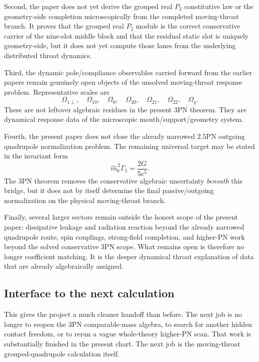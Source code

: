 \documentclass[11pt]{article}
\begin{document}
Second, the paper does not yet derive the grouped real $P_2$ constitutive law or
the geometry-side completion microscopically from the completed moving-throat
branch.  It proves that the grouped real $P_2$ module is the correct
conservative carrier of the nine-slot middle block and that the residual static
slot is uniquely geometry-side, but it does not yet compute those lanes from the
underlying distributed throat dynamics.

Third, the dynamic pole/compliance observables carried forward from the earlier
papers remain genuinely open objects of the unsolved moving-throat response
problem.  Representative scales are
\begin{equation}
\Omega_{1\perp},\quad
\Omega_{10},\quad
\Omega_0,\quad
\Omega_{20},\quad
\Omega_{21},\quad
\Omega_{22},\quad
\Omega_g.
\label{eq:conclusions-open-poles}
\end{equation}
These are not leftover algebraic residues in the present $3$PN theorem.  They
are dynamical response data of the microscopic mouth/support/geometry system.

Fourth, the present paper does not close the already narrowed $2.5$PN outgoing
quadrupole normalization problem.  The remaining universal target may be stated
in the invariant form
\begin{equation}
\boxed{\hat m_0^{\,2}\Gamma_5=\frac{2G}{5c^5}.}
\label{eq:conclusions-normalization-target}
\end{equation}
The $3$PN theorem removes the conservative algebraic uncertainty \emph{beneath}
this bridge, but it does not by itself determine the final passive/outgoing
normalization on the physical moving-throat branch.

Finally, several larger sectors remain outside the honest scope of the present
paper: dissipative leakage and radiation reaction beyond the already narrowed
quadrupole route, spin couplings, strong-field completion, and higher-PN work
beyond the solved conservative $3$PN scope.  What remains open is therefore no
longer coefficient matching.  It is the deeper dynamical throat explanation of
data that are already algebraically assigned.

\subsection{Interface to the next calculation}
\label{sec:conclusions-next}

This gives the project a much cleaner handoff than before.  The next job is no
longer to reopen the $3$PN comparable-mass algebra, to search for another hidden
contact freedom, or to rerun a vague whole-theory higher-PN scan.  That work is
substantially finished in the present chart.  The next job is the
moving-throat grouped-quadrupole calculation itself.
\end{document}
